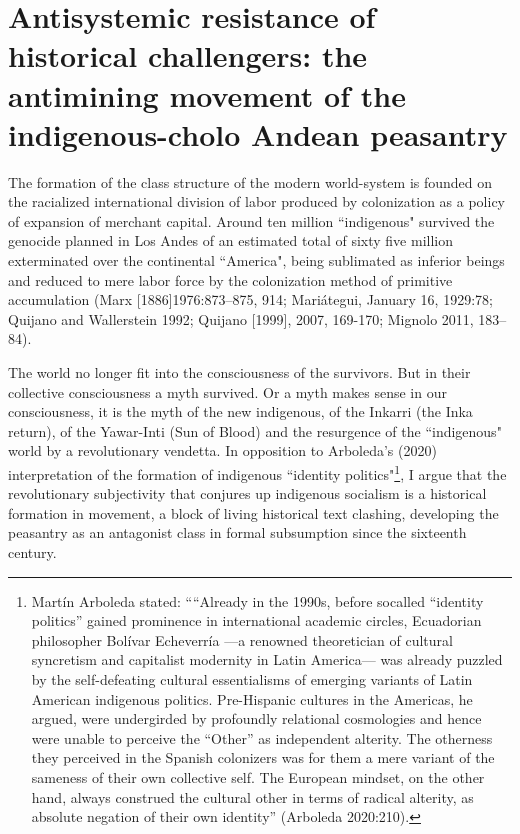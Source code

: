 \documentclass[]{interact}
\theoremstyle{plain}%
\theoremstyle{definition}
\theoremstyle{remark}
\begin{document}
\section{Antisystemic resistance of historical challengers: the antimining movement of the indigenous-cholo Andean peasantry}

The formation of the class structure of the modern world-system is founded on the racialized international division of labor produced by colonization as a policy of expansion of merchant capital. Around ten million “indigenous" survived the genocide planned in Los Andes of an estimated total of sixty five million exterminated over the continental “America", being sublimated as inferior beings and reduced to mere labor force by the colonization method of primitive accumulation (Marx [1886]1976:873–875, 914; Mariátegui, January 16, 1929:78; Quijano and Wallerstein 1992; Quijano [1999], 2007, 169-170; Mignolo 2011, 183–84).

The world no longer fit into the consciousness of the survivors. But in their collective consciousness a myth survived. Or a myth makes sense in our consciousness, it is the myth of the new indigenous, of the Inkarri (the Inka return), of the Yawar-Inti (Sun of Blood) and the resurgence of the “indigenous" world by a revolutionary vendetta. In opposition to Arboleda's (2020) interpretation of the formation of indigenous “identity politics"\footnote{Martín Arboleda stated: ““Already in the 1990s, before socalled “identity politics” gained prominence in international academic circles, Ecuadorian philosopher Bolívar Echeverría —a renowned theoretician of cultural syncretism and capitalist modernity in Latin America— was already puzzled by the self-defeating cultural essentialisms of emerging variants of Latin American indigenous politics. Pre-Hispanic cultures in the Americas, he argued, were undergirded by profoundly relational cosmologies and hence were unable to perceive the “Other” as independent alterity. The otherness they perceived in the Spanish colonizers was for them a mere variant of the sameness of their own collective self. The European mindset, on the other hand, always construed the cultural other in terms of radical alterity, as absolute negation of their own identity” (Arboleda 2020:210).}, I argue that the revolutionary subjectivity that conjures up indigenous socialism is a historical formation in movement, a block of living historical text clashing, developing the peasantry as an antagonist class in formal subsumption since the sixteenth century. 
\end{document}
